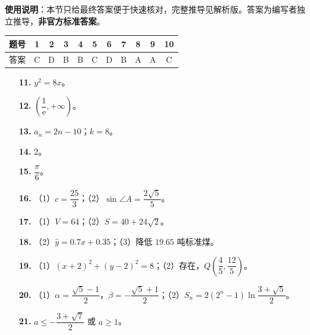 
\begin{gknotice}
\textbf{使用说明}：本节只给最终答案便于快速核对，完整推导见解析版。答案为编写者独立推导，\textbf{非官方标准答案}。
\end{gknotice}

\begin{center}\begin{tabular}{ccccccccccc}
\toprule
题号 & 1 & 2 & 3 & 4 & 5 & 6 & 7 & 8 & 9 & 10 \\
\midrule
答案 & C & D & B & B & C & D & B & A & A & C \\
\bottomrule
\end{tabular}\end{center}

\begin{itemize}[leftmargin=2.6em]
  \item[\textbf{11.}] $y^2=8x$。
  \item[\textbf{12.}] $\left(\dfrac1{\mathrm e},+\infty\right)$。
  \item[\textbf{13.}] $a_n=2n-10$；$k=8$。
  \item[\textbf{14.}] $2$。
  \item[\textbf{15.}] $\dfrac{\pi}{6}$。
\end{itemize}

\begin{itemize}[leftmargin=2.6em]
  \item[\textbf{16.}] （1）$c=\dfrac{25}{3}$；（2）$\sin\angle A=\dfrac{2\sqrt5}{5}$。
  \item[\textbf{17.}] （1）$V=64$；（2）$S=40+24\sqrt2$。
  \item[\textbf{18.}] （2）$\hat y=0.7x+0.35$；（3）降低 $19.65$ 吨标准煤。
  \item[\textbf{19.}] （1）$(x+2)^2+(y-2)^2=8$；（2）存在，$Q\left(\dfrac45,\dfrac{12}{5}\right)$。
  \item[\textbf{20.}] （1）$\alpha=\dfrac{\sqrt5-1}{2}$，$\beta=-\dfrac{\sqrt5+1}{2}$；（2）$S_n=2(2^n-1)\ln\dfrac{3+\sqrt5}{2}$。
  \item[\textbf{21.}] $a\leqslant-\dfrac{3+\sqrt7}{2}$ 或 $a\geqslant1$。
\end{itemize}
